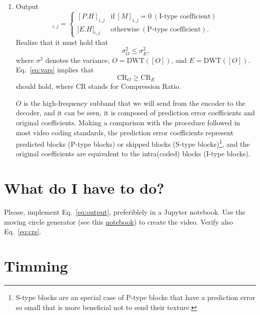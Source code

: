\begin{enumerate}
\item Output
  \begin{equation}
    [O]_{i,j} = \left\{
      \begin{array}{ll}
        [P.H]_{i,j} & \text{if}~[M]_{i,j} = 0~(\text{I-type~coefficient})\\
        {[}E.H{]}_{i,j} & \text{otherwise}~(\text{P-type~coefficient}).
      \end{array}
    \right.
    \label{eq:output}
  \end{equation}
  Realize that it must hold that
  \begin{equation}
    \sigma^2_O \le \sigma^2_E,
    \label{eq:vars}
  \end{equation}
  where $\sigma^2$ denotes the variance, $O=\text{DWT}([O])$, and
  $E=\text{DWT}([O])$. Eq.~\ref{eq:vars} implies that
  \begin{equation}
    \text{CR}_O \ge \text{CR}_E
    \label{eq:crs}
  \end{equation}
  should hold, where CR stands for Compression Ratio.

  $O$ is the high-frequency subband that we will send from the
  encoder to the decoder, and it can be seen, it is composed of
  prediction error coefficients and original coefficients. Making a
  comparison with the procedure followed in most video coding
  standards, the prediction error coefficients represent predicted
  blocks (P-type blocks) or skipped blocks (S-type
  blocks)\footnote{S-type blocks are an special case of P-type blocks
  that have a prediction error so small that is more beneficial not to
  send their texture.}, and the original coefficients are equivalent
  to the intra(coded) blocks (I-type blocks).
\end{enumerate}

\section{What do I have to do?}

Please, implement Eq.~\ref{eq:output}, preferiblely in a Jupyter
notebook. Use the moving circle generator (see
this \href{https://github.com/Sistemas-Multimedia/Sistemas-Multimedia.github.io/blob/master/milestones/11-MC_in_DWT_domain/DWT_shift_invariance.ipynb}{notebook})
to create the video. Verify also Eq.~\ref{eq:crs}.

\section{Timming}

